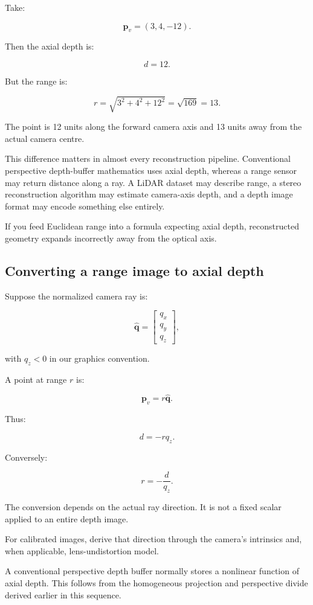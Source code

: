 Take:

\[ \mathbf p_v=(3,4,-12). \]

Then the axial depth is:

\[ \boxed{d=12}. \]

But the range is:

\[ r=\sqrt{3^2+4^2+12^2} =\sqrt{169} =\boxed{13}. \]

The point is 12 units along the forward camera axis and 13 units away from the actual camera centre.

This difference matters in almost every reconstruction pipeline. Conventional perspective depth-buffer mathematics uses axial depth, whereas a range sensor may return distance along a ray. A LiDAR dataset may describe range, a stereo reconstruction algorithm may estimate camera-axis depth, and a depth image format may encode something else entirely.

If you feed Euclidean range into a formula expecting axial depth, reconstructed geometry expands incorrectly away from the optical axis.

\subsection{Converting a range image to axial depth}\label{02-foundations-ii-ch035-converting-a-range-image-to-axial-depth}

Suppose the normalized camera ray is:

\[ \hat{\mathbf q}= \begin{bmatrix}q_x\\q_y\\q_z\end{bmatrix}, \]

with \(q_z<0\) in our graphics convention.

A point at range \(r\) is:

\[ \mathbf p_v=r\hat{\mathbf q}. \]

Thus:

\[ \boxed{d=-rq_z}. \]

Conversely:

\[ \boxed{r=-\frac d{q_z}}. \]

The conversion depends on the actual ray direction. It is not a fixed scalar applied to an entire depth image.

For calibrated images, derive that direction through the camera's intrinsics and, when applicable, lens-undistortion model.

A conventional perspective depth buffer normally stores a nonlinear function of axial depth. This follows from the homogeneous projection and perspective divide derived earlier in this sequence.

